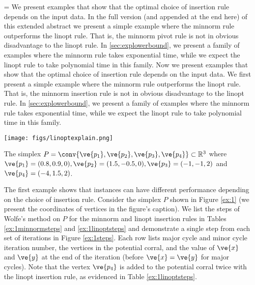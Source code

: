 \ifnum\version=\stocversion
We present examples that show that the optimal choice of insertion rule depends on the input data. 
In the full version \cite{1710.02608} (and appended at the end here) of this extended abstract we present a simple example where the minnorm rule outperforms the linopt rule.
That is, the minnorm pivot rule is not in obvious disadvantage to the linopt rule.
In \cref{sec:explowerbound}, we present a family of examples where the minnorm rule takes exponential time, while we expect the linopt rule to take polynomial time in this family.
\else
Now we present examples that show that the optimal choice of insertion rule depends on the input data. 
We first present a simple example where the minnorm rule outperforms the linopt rule.
That is, the minnorm insertion rule is not in obvious disadvantage to the linopt rule.
In \cref{sec:explowerbound}, we present a family of examples where the minnorm rule takes exponential time, while we expect the linopt rule to take polynomial time in this family.


\begin{myfigure}[ht]
\centering
		\texttt{[image: figs/linoptexplain.png]}
	\caption{The simplex $P = \conv\{\ve{p_1},\ve{p_2},\ve{p_3},\ve{p_4}\} \subset \mathbb{R}^3$ where $\ve{p_1} = (0.8,0.9,0), \ve{p_2} = (1.5,-0.5,0), \ve{p_3} = (-1,-1,2)$ and $\ve{p_4} = (-4,1.5,2)$.}
	\label{ex:1}
\end{myfigure}


The first example shows that instances can have different performance depending on the choice of insertion rule.  Consider the simplex $P$ shown in Figure \ref{ex:1} (we present the coordinates of vertices in the figure's caption). We list the steps of Wolfe's method on $P$ for the minnorm and linopt insertion rules in Tables \ref{ex:1minnormsteps} and \ref{ex:1linoptsteps} and demonstrate a single step from each set of iterations in Figure \ref{ex:1steps}.  Each row lists major cycle and minor cycle iteration number, the vertices in the potential corral, and the value of $\ve{x}$ and $\ve{y}$ at the end of the iteration (before $\ve{x} = \ve{y}$ for major cycles).  Note that the vertex $\ve{p_4}$ is added to the potential corral twice with the linopt insertion rule, as evidenced in Table \ref{ex:1linoptsteps}.

